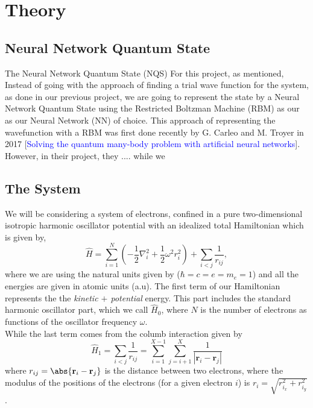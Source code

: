 \section{Theory}
\subsection{Neural Network Quantum State}
The Neural Network Quantum State (NQS) For this project, as mentioned, 
Instead of going with the approach of finding a trial wave function for the system, as done in our previous project, we are going to represent the state by a Neural Network Quantum State using the Restricted Boltzman Machine (RBM) as our as our Neural Network (NN) of choice. This approach of representing the wavefunction with a RBM was first done recently by G. Carleo and M. Troyer in 2017 [\textcolor{blue}{Solving the quantum many-body problem with artificial neural networks}]. However, in their project, they .... while we

\subsection{The System}
We will be considering a system of electrons, confined in a pure two-dimensional 
isotropic harmonic oscillator potential with an idealized total Hamiltonian which is given by,
\begin{equation}
\label{eq:finalH}
\hat{H}=\sum_{i=1}^{N} \left(  -\frac{1}{2} \nabla_i^2 + \frac{1}{2} \omega^2r_i^2  \right)+\sum_{i<j}\frac{1}{r_{ij}},
\end{equation}
where we are using the natural units given by ($\hbar=c=e=m_e=1$) and all the energies are given in atomic units (a.u). The first term of our Hamiltonian represents the the \textit{kinetic $+$ potential} energy. This part includes the standard harmonic oscillator part, which we call $\hat{H}_0$, where $N$ is the number of electrons as functions of the oscillator frequency $\omega$.\\ While the last term comes from the columb interaction given by
\begin{equation*}
\hat{H}_1 = \sum_{i<j}\frac{1}{r_{ij}} = \sum_{i=1}^{X-1} \sum_{j=i+1}^{X} \frac{1}{|\mathbf{r}_i - \mathbf{r}_j|}
\end{equation*}
where $r_{ij} = \abs{\mathbf{r}_i - \mathbf{r}_j}$ is the distance between two electrons, where the modulus of the positions of the electrons (for a given electron $i$) is $r_i = \sqrt{r^2_{i_x} + r^2_{i_y}}$. \\

